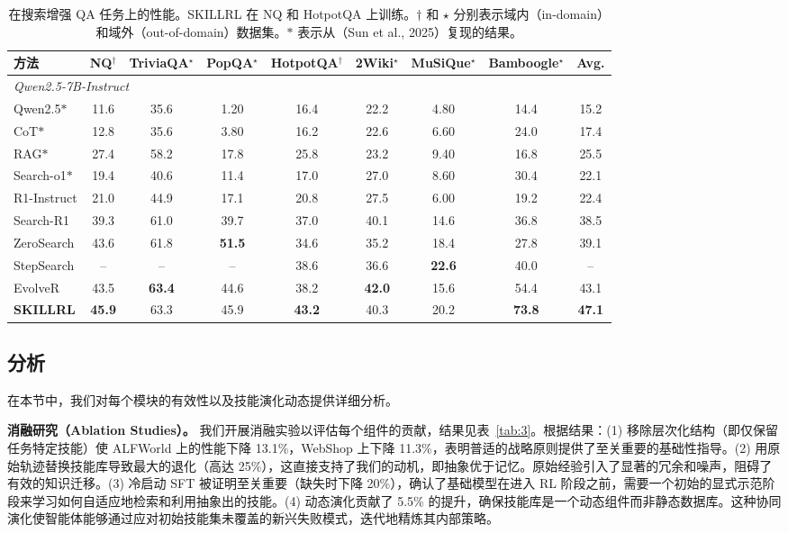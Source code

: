 \documentclass[11pt,UTF8,fontset=fandol]{ctexart}
\newcommand{\best}[1]{\textcolor{best}{\textbf{#1}}}
\begin{document}
\begin{table}[H]\centering
\caption{在搜索增强 QA 任务上的性能。SKILLRL 在 NQ 和 HotpotQA 上训练。$\dagger$ 和 $\star$ 分别表示域内（in-domain）和域外（out-of-domain）数据集。$\ast$ 表示从（Sun et al., 2025）复现的结果。}
\label{tab:2}
\small
\setlength{\tabcolsep}{4.5pt}
\begin{tabular}{lcccccccc}
\toprule
方法 & NQ$^\dagger$ & TriviaQA$^\star$ & PopQA$^\star$ & HotpotQA$^\dagger$ & 2Wiki$^\star$ & MuSiQue$^\star$ & Bamboogle$^\star$ & Avg. \\
\midrule
\multicolumn{9}{l}{\textit{Qwen2.5-7B-Instruct}} \\
Qwen2.5$\ast$ & 11.6 & 35.6 & 1.20 & 16.4 & 22.2 & 4.80 & 14.4 & 15.2 \\
CoT$\ast$ & 12.8 & 35.6 & 3.80 & 16.2 & 22.6 & 6.60 & 24.0 & 17.4 \\
RAG$\ast$ & 27.4 & 58.2 & 17.8 & 25.8 & 23.2 & 9.40 & 16.8 & 25.5 \\
Search-o1$\ast$ & 19.4 & 40.6 & 11.4 & 17.0 & 27.0 & 8.60 & 30.4 & 22.1 \\
R1-Instruct & 21.0 & 44.9 & 17.1 & 20.8 & 27.5 & 6.00 & 19.2 & 22.4 \\
Search-R1 & 39.3 & 61.0 & 39.7 & 37.0 & 40.1 & 14.6 & 36.8 & 38.5 \\
ZeroSearch & 43.6 & 61.8 & \best{51.5} & 34.6 & 35.2 & 18.4 & 27.8 & 39.1 \\
StepSearch & -- & -- & -- & 38.6 & 36.6 & \best{22.6} & 40.0 & -- \\
EvolveR & 43.5 & \best{63.4} & 44.6 & 38.2 & \best{42.0} & 15.6 & 54.4 & 43.1 \\
\textbf{SKILLRL} & \best{45.9} & 63.3 & 45.9 & \best{43.2} & 40.3 & 20.2 & \best{73.8} & \best{47.1} \\
\bottomrule
\end{tabular}
\end{table}

\subsection{分析}

在本节中，我们对每个模块的有效性以及技能演化动态提供详细分析。

\textbf{消融研究（Ablation Studies）。} 我们开展消融实验以评估每个组件的贡献，结果见表~\ref{tab:3}。根据结果：(1) 移除层次化结构（即仅保留任务特定技能）使 ALFWorld 上的性能下降 13.1\%，WebShop 上下降 11.3\%，表明普适的战略原则提供了至关重要的基础性指导。(2) 用原始轨迹替换技能库导致最大的退化（高达 25\%），这直接支持了我们的动机，即抽象优于记忆。原始经验引入了显著的冗余和噪声，阻碍了有效的知识迁移。(3) 冷启动 SFT 被证明至关重要（缺失时下降 20\%），确认了基础模型在进入 RL 阶段之前，需要一个初始的显式示范阶段来学习如何自适应地检索和利用抽象出的技能。(4) 动态演化贡献了 5.5\% 的提升，确保技能库是一个动态组件而非静态数据库。这种协同演化使智能体能够通过应对初始技能集未覆盖的新兴失败模式，迭代地精炼其内部策略。
\end{document}
